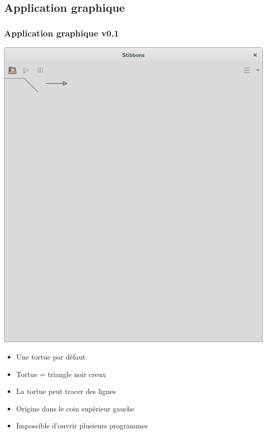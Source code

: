 \subsection{Application graphique}

\begin{frame}
\frametitle{Application graphique v0.1}
\begin{center}
\includegraphics[scale=0.16]{doc/Presentation/screenshot/stibbons-0-1-2.png}
\end{center}

\begin{itemize}
	\item Une tortue par défaut
	\item Tortue = triangle noir creux
	\item La tortue peut tracer des lignes
	\item Origine dans le coin supérieur gauche
	\item Impossible d'ouvrir plusieurs programmes
\end{itemize}
\end{frame}

